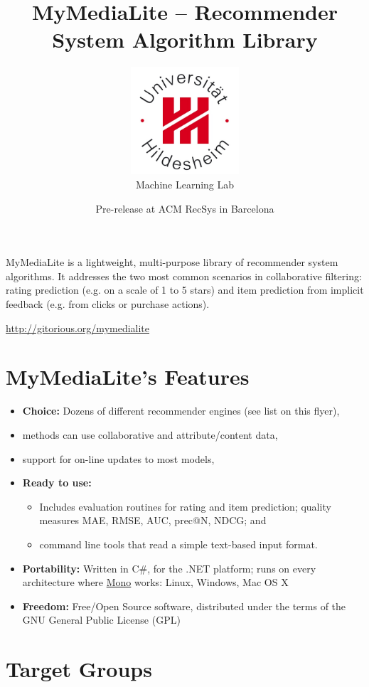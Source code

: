 \documentclass[a4paper, foldmark, 12pt]{leaflet}
\title{MyMediaLite -- Recommender System Algorithm Library}
\author{
	\includegraphics[width=4.0cm]{fig/uni-hildesheim-400x400.jpg}\\
	Machine Learning Lab
}
\date{Pre-release at ACM RecSys in Barcelona}
\begin{document}
\maketitle


MyMediaLite is a lightweight, multi-purpose library
of recommender system algorithms.
It addresses the two most common scenarios in collaborative filtering:
rating prediction (e.g. on a scale of 1 to 5 stars)
and item prediction from implicit feedback (e.g. from clicks or purchase actions).

\begin{center}
	\url{http://gitorious.org/mymedialite}
\end{center}

\newpage

\section{MyMediaLite's Features}

\begin{itemize}
	\item \textbf{Choice:} Dozens of different recommender engines (see list on this flyer),
	\item methods can use collaborative and attribute/content data,
	\item support for on-line updates to most models,
	\item \textbf{Ready to use:}
		\begin{itemize}
			\item Includes evaluation routines for rating and item prediction;
			      quality measures MAE, RMSE, AUC, prec@N, NDCG; and
			\item command line tools that read a simple text-based input format.
		\end{itemize}
	\item \textbf{Portability:} Written in C\#, for the .NET platform;
	      runs on every architecture where \href{www.mono-project.com}{Mono} works:
	      Linux, Windows, Mac OS X
	\item \textbf{Freedom:} Free/Open Source software, distributed under the terms of the
	      GNU General Public License (GPL)
\end{itemize}

\newpage

\section{Target Groups}
\end{document}
